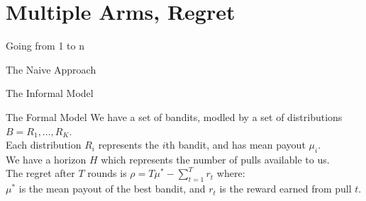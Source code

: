 \documentclass{powerdot}
\begin{document}
\section{Multiple Arms, Regret}
\begin{slide}{Going from 1 to n}
\end{slide}

\begin{slide}{The Naive Approach}
\end{slide}

\begin{slide}{The Informal Model}
\end{slide}

\begin{slide}{The Formal Model}
  We have a set of bandits, modled by a set of distributions $B = {R_1, ..., R_K}$.\\
  Each distribution $R_i$ represents the $i$th bandit, and has mean payout $\mu_i$.\\
  We have a horizon $H$ which represents the number of pulls available to us.\\
  The regret after $T$ rounds is $\rho = T\mu^* - \sum_{t=1}^{T}r_t$ where:\\
  $\mu^*$ is the mean payout of the best bandit, and $r_t$ is the reward earned
  from pull $t$.
\end{slide}
\end{document}
